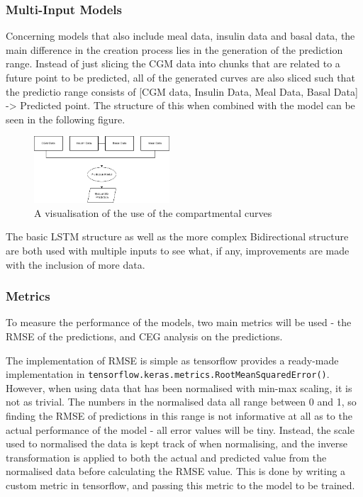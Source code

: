       \subsubsection{Multi-Input Models}

      Concerning models that also include meal data, insulin data and basal data, the main difference in the creation process lies in the generation of the prediction range. Instead of just slicing the CGM data into chunks that are related to a future point to be predicted, all of the generated curves are also sliced such that the predictio range consists of [CGM data, Insulin Data, Meal Data, Basal Data] -> Predicted point. The structure of this when combined with the model can be seen in the following figure.

      \begin{figure}[H]
        \centering

        \includegraphics[width=0.45\textwidth]{images/multiIn.png}
        \caption{
         A visualisation of the use of the compartmental curves
        }
      \end{figure}

      The basic LSTM structure as well as the more complex Bidirectional structure are both used with multiple inputs to see what, if any, improvements are made with the inclusion of more data.

      \subsubsection{Metrics}

      To measure the performance of the models, two main metrics will be used - the RMSE of the predictions, and CEG analysis on the predictions.

      The implementation of RMSE is simple as tensorflow provides a ready-made implementation in \Verb+tensorflow.keras.metrics.RootMeanSquaredError()+. However, when using data that has been normalised with min-max scaling, it is not as trivial. The numbers in the normalised data all range between 0 and 1, so finding the RMSE of predictions in this range is not informative at all as to the actual performance of the model - all error values will be tiny. Instead, the scale used to normalised the data is kept track of when normalising, and the inverse transformation is applied to both the actual and predicted value from the normalised data before calculating the RMSE value. This is done by writing a custom metric in tensorflow, and passing this metric to the model to be trained.
      
